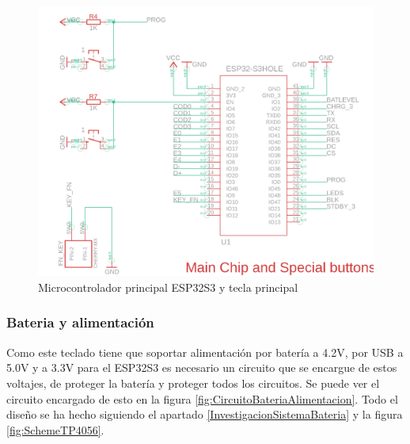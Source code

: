 \begin{figure}[H]
    \centering
    \includegraphics[width=1.0\textwidth]{imagenes/Capitulos/Cap04/CHIP.png}
    \caption{Microcontrolador principal ESP32S3 y tecla principal \cite{Repo:ImagenCircuito}}
    \label{fig:ESP32S3Circuito}
\end{figure}

\newpage
\subsubsection{Bateria y alimentación}
Como este teclado tiene que soportar alimentación por batería a 4.2V, por \gls{USB} a 5.0V y a 3.3V para el ESP32S3 es necesario un circuito que se encargue de estos voltajes, de proteger la batería y proteger todos los circuitos. Se puede ver el circuito encargado de esto en la figura \ref{fig:CircuitoBateriaAlimentacion}. Todo el diseño se ha hecho siguiendo el apartado \ref{InvestigacionSistemaBateria} y la figura \ref{fig:SchemeTP4056}.

